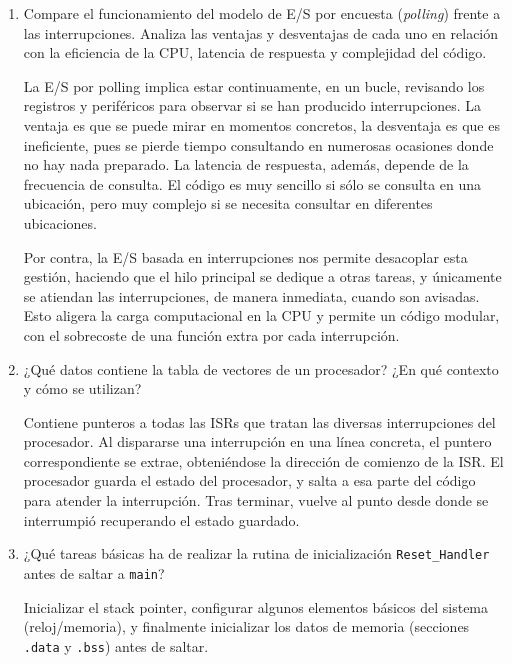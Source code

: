 \documentclass[svgnames,spanish,11pt,a4paper]{article}
\newcounter{solution}
\begin{document}
\begin{enumerate}
        \item Compare el funcionamiento del modelo de E/S por encuesta (\emph{polling}) frente a las interrupciones. Analiza las ventajas y desventajas de cada uno en relación con la eficiencia de la CPU, latencia de respuesta y complejidad del código.
                
            \begin{solution}
                La E/S por polling implica estar continuamente, en un bucle, revisando los registros y periféricos para observar si se han producido interrupciones. La ventaja es que se puede mirar en momentos concretos, la desventaja es que es ineficiente, pues se pierde tiempo consultando en numerosas ocasiones donde no hay nada preparado. La latencia de respuesta, además, depende de la frecuencia de consulta. El código es muy sencillo si sólo se consulta en una ubicación, pero muy complejo si se necesita consultar en diferentes ubicaciones.

                Por contra, la E/S basada en interrupciones nos permite desacoplar esta gestión, haciendo que el hilo principal se dedique a otras tareas, y únicamente se atiendan las interrupciones, de manera inmediata, cuando son avisadas. Esto aligera la carga computacional en la CPU y permite un código modular, con el sobrecoste de una función extra por cada interrupción.
            \end{solution}
        

        \item ¿Qué datos contiene la tabla de vectores de un procesador? ¿En qué contexto y cómo se utilizan?
        
            \begin{solution}
                Contiene punteros a todas las ISRs que tratan las diversas interrupciones del procesador. Al dispararse una interrupción en una línea concreta, el puntero correspondiente se extrae, obteniéndose la dirección de comienzo de la ISR. El procesador guarda el estado del procesador, y salta a esa parte del código para atender la interrupción. Tras terminar, vuelve al punto desde donde se interrumpió recuperando el estado guardado.
            \end{solution}

        \item ¿Qué tareas básicas ha de realizar la rutina de inicialización \texttt{Reset\_Handler} antes de saltar a \texttt{main}?
        
            \begin{solution}
                Inicializar el stack pointer, configurar algunos elementos básicos del sistema (reloj/memoria), y finalmente inicializar los datos de memoria (secciones \texttt{.data} y \texttt{.bss}) antes de saltar.
            \end{solution}


\end{enumerate}
\end{document}
